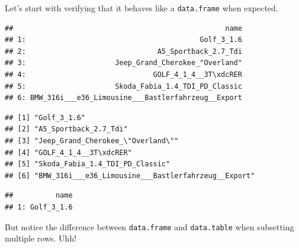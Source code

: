 \documentclass[]{book}
\newenvironment{Shaded}{\begin{snugshade}}{\end{snugshade}}
\newcommand{\DecValTok}[1]{\textcolor[rgb]{0.00,0.00,0.81}{#1}}
\newcommand{\NormalTok}[1]{#1}
\newcommand{\OperatorTok}[1]{\textcolor[rgb]{0.81,0.36,0.00}{\textbf{#1}}}
\newcommand{\StringTok}[1]{\textcolor[rgb]{0.31,0.60,0.02}{#1}}
\theoremstyle{definition}
\theoremstyle{definition}
\theoremstyle{definition}
\theoremstyle{remark}
\begin{document}
Let's start with verifying that it behaves like a \texttt{data.frame} when expected.

\begin{Shaded}
\end{Shaded}

\begin{verbatim}
##                                                  name
## 1:                                         Golf_3_1.6
## 2:                               A5_Sportback_2.7_Tdi
## 3:                     Jeep_Grand_Cherokee_"Overland"
## 4:                              GOLF_4_1_4__3T\xdcRER
## 5:                     Skoda_Fabia_1.4_TDI_PD_Classic
## 6: BMW_316i___e36_Limousine___Bastlerfahrzeug__Export
\end{verbatim}

\begin{Shaded}
\end{Shaded}

\begin{verbatim}
## [1] "Golf_3_1.6"                                        
## [2] "A5_Sportback_2.7_Tdi"                              
## [3] "Jeep_Grand_Cherokee_\"Overland\""                  
## [4] "GOLF_4_1_4__3T\xdcRER"                             
## [5] "Skoda_Fabia_1.4_TDI_PD_Classic"                    
## [6] "BMW_316i___e36_Limousine___Bastlerfahrzeug__Export"
\end{verbatim}

\begin{Shaded}
\end{Shaded}

\begin{verbatim}
##          name
## 1: Golf_3_1.6
\end{verbatim}

But notice the difference between \texttt{data.frame} and \texttt{data.table} when subsetting multiple rows. Uhh!
\end{document}
